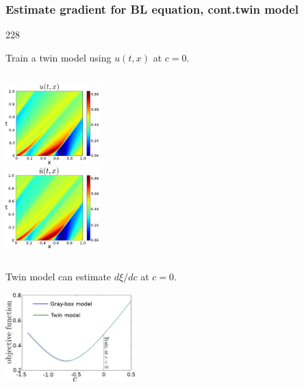 \documentclass{beamer}
\newcommand{\barrow}{\item[\color{darkred}\ding{228}]}
\begin{document}
\begin{frame}
    \frametitle{Estimate gradient for BL equation, cont.\hfill\scriptsize{twin model}}\small
    \begin{dinglist}{228}
    \barrow Train a twin model using $u(t,x)$ at $c=0$.
    \begin{columns}
         \centering
            \includegraphics[width=3.6cm]{leftcol.png}\\
         \centering
            \includegraphics[width=3.6cm]{rightcol.png}\\
    \end{columns}
    \barrow Twin model can estimate ${d\xi} \slash {dc}$ at $c=0$.
    \begin{center}
        \includegraphics[width=5cm]{J_twin_vs_primal.png}
    \end{center}
    \end{dinglist}
\end{frame}
\end{document}
